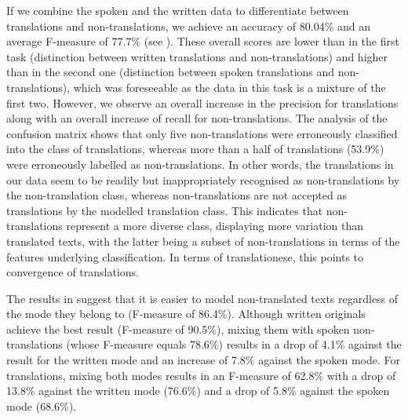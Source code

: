\documentclass[output=paper,colorlinks,citecolor=brown]{langscibook}
\begin{document}
If we combine the spoken and the written data to differentiate between translations and non-translations, we achieve an accuracy of 80.04\% and an average F-measure of 77.7\% (see ).  These overall scores are lower than in the first task (distinction between written translations and non-translations) and higher than in the second one (distinction between spoken translations and non-translations), which was foreseeable as the data in this task is a mixture of the first two. However, we observe an overall increase in the precision for translations along with an overall increase of recall for non-translations. The analysis of the confusion matrix shows that only five non-translations were erroneously classified into the class of translations, whereas more than a half of translations (53.9\%) were erroneously labelled as non-translations.
In other words, the translations in our data seem to be readily but inappropriately recognised as non-translations by the non-translation class, whereas non-translations are not accepted as translations by the modelled translation class. This indicates that non-translations represent a more diverse class, displaying more variation than translated texts, with the latter being a subset of non-translations in terms of the features underlying classification. In terms of translationese, this points to convergence of translations.

The results in  suggest that it is easier to model non-translated texts regardless of the mode they belong to (F-measure of 86.4\%). Although written originals achieve the best result (F-measure of 90.5\%), mixing them with spoken non-translations (whose F-measure equals 78.6\%) results in a drop of 4.1\% against the result for the written mode and an increase of 7.8\% against the spoken mode. For translations, mixing both modes results in an F-measure of 62.8\% with a drop of 13.8\% against the written mode (76.6\%) and a drop of 5.8\% against the spoken mode (68.6\%).
\end{document}
